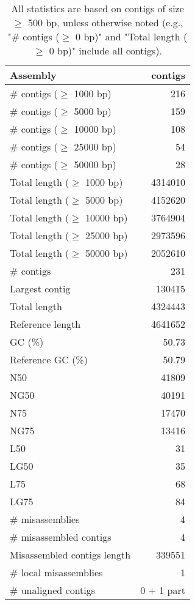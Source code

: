 \documentclass[12pt,a4paper]{article}
\begin{document}
\begin{table}[ht]
\begin{center}
\caption{All statistics are based on contigs of size $\geq$ 500 bp, unless otherwise noted (e.g., "\# contigs ($\geq$ 0 bp)" and "Total length ($\geq$ 0 bp)" include all contigs).}
\begin{tabular}{|l*{1}{|r}|}
\hline
Assembly & contigs \\ \hline
\# contigs ($\geq$ 1000 bp) & 216 \\ \hline
\# contigs ($\geq$ 5000 bp) & 159 \\ \hline
\# contigs ($\geq$ 10000 bp) & 108 \\ \hline
\# contigs ($\geq$ 25000 bp) & 54 \\ \hline
\# contigs ($\geq$ 50000 bp) & 28 \\ \hline
Total length ($\geq$ 1000 bp) & 4314010 \\ \hline
Total length ($\geq$ 5000 bp) & 4152620 \\ \hline
Total length ($\geq$ 10000 bp) & 3764904 \\ \hline
Total length ($\geq$ 25000 bp) & 2973596 \\ \hline
Total length ($\geq$ 50000 bp) & 2052610 \\ \hline
\# contigs & 231 \\ \hline
Largest contig & 130415 \\ \hline
Total length & 4324443 \\ \hline
Reference length & 4641652 \\ \hline
GC (\%) & 50.73 \\ \hline
Reference GC (\%) & 50.79 \\ \hline
N50 & 41809 \\ \hline
NG50 & 40191 \\ \hline
N75 & 17470 \\ \hline
NG75 & 13416 \\ \hline
L50 & 31 \\ \hline
LG50 & 35 \\ \hline
L75 & 68 \\ \hline
LG75 & 84 \\ \hline
\# misassemblies & 4 \\ \hline
\# misassembled contigs & 4 \\ \hline
Misassembled contigs length & 339551 \\ \hline
\# local misassemblies & 1 \\ \hline
\# unaligned contigs & 0 + 1 part \\ \hline

\end{tabular}
\end{center}
\end{table}
\end{document}
